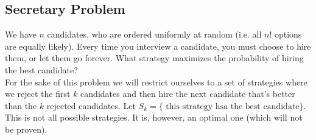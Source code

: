 \documentclass[a4paper]{article}
\begin{document}
\subsection{Secretary Problem}
We have $n$ candidates, who are ordered uniformly at random (i.e. all  $n!$ options are equally likely). 
Every time you interview a candidate, you must choose to hire them, or let them go forever. What strategy
maximizes the probability of hiring the best candidate? \\

For the sake of this problem we will restrict ourselves to a set of strategies where we reject the first
 $k$ candidates and then hire the next candidate that's better than the $k$ rejected candidates. Let
 $S_k = \{\text{ this strategy hsa the best candidate}\}$. This is not
 all possible strategies. It is, however, an optimal one (which will not be proven). 
\end{document}
